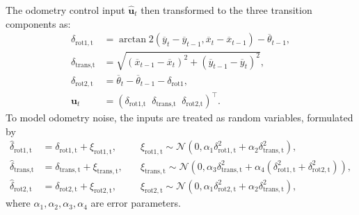 The odometry control input $\hat{\mathbf{u}}_t$
then transformed to the three transition components as:
\begin{align}
    \delta_{\mathrm{rot1,t}} & =\arctan\!2\left(\overline{y}_{t}-\overline{y}_{t-1}, \overline{x}_{t}-\overline{x}_{t-1}\right)-\overline{\theta}_{t-1}, \\
    \delta_{\text {trans,t}} & =\sqrt{\left(\overline{x}_{t-1}-\overline{x}_{t}\right)^{2}+\left(\overline{y}_{t-1}-\overline{y}_{t}\right)^{2}},        \\
    \delta_{\mathrm{rot2,t}} & =\overline{\theta}_{t}-\overline{\theta}_{t-1}-\delta_{\mathrm{rot} 1},                                                   \\
    \mathbf{u}_t             & = (\delta_{\text{rot1,t}}\;\;\delta_{\text{trans,t}}\;\;\delta_{\text{rot2,t}})^{\top}. \label{eq:odom-delta-input}
\end{align}
To model odometry noise, the inputs are treated as random variables, formulated by
\begin{align}
    \hat{\delta}_{\mathrm{rot1,t}} & = \delta_{\mathrm{rot1,t}} + \xi_{\mathrm{rot1,t}},
    \quad                          & \xi_{\mathrm{rot1,t}} \sim \mathcal{N}(0,\alpha_1\delta_{\mathrm{rot1,t}}^2+\alpha_2\delta_{\mathrm{trans,t}}^2), \label{eq:odom-control-1}                               \\
    \hat{\delta}_{\text {trans,t}} & = \delta_{\mathrm{trans,t}} + \xi_{\mathrm{trans,t}},
    \quad                          & \xi_{\mathrm{trans,t}} \sim \mathcal{N}(0,\alpha_3\delta_{\mathrm{trans,t}}^2+\alpha_4(\delta_{\mathrm{rot1,t}}^2+\delta_{\mathrm{rot2,t}}^2)), \label{eq:odom-control-2} \\
    \hat{\delta}_{\mathrm{rot2,t}} & = \delta_{\mathrm{rot2,t}} + \xi_{\mathrm{rot2,t}},
    \quad                          & \xi_{\mathrm{rot2,t}} \sim \mathcal{N}(0,\alpha_1\delta_{\mathrm{rot2,t}}^2+\alpha_2\delta_{\mathrm{trans,t}}^2), \label{eq:odom-control-3}
\end{align}
where $\alpha_1,\alpha_2,\alpha_3,\alpha_4$ are error parameters.

